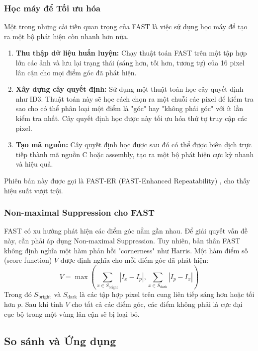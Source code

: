 \subsubsection{Học máy để Tối ưu hóa}
\label{subsubsec:fast_machine_learning}
Một trong những cải tiến quan trọng của FAST là việc sử dụng học máy để tạo ra một bộ phát hiện còn nhanh hơn nữa.
\begin{enumerate}
    \item \textbf{Thu thập dữ liệu huấn luyện:} Chạy thuật toán FAST trên một tập hợp lớn các ảnh và lưu lại trạng thái (sáng hơn, tối hơn, tương tự) của 16 pixel lân cận cho mọi điểm góc đã phát hiện.
    \item \textbf{Xây dựng cây quyết định:} Sử dụng một thuật toán học cây quyết định như ID3. Thuật toán này sẽ học cách chọn ra một chuỗi các pixel để kiểm tra sao cho có thể phân loại một điểm là "góc" hay "không phải góc" với ít lần kiểm tra nhất. Cây quyết định học được này tối ưu hóa thứ tự truy cập các pixel.
    \item \textbf{Tạo mã nguồn:} Cây quyết định học được sau đó có thể được biên dịch trực tiếp thành mã nguồn C hoặc assembly, tạo ra một bộ phát hiện cực kỳ nhanh và hiệu quả.
\end{enumerate}
Phiên bản này được gọi là FAST-ER (FAST-Enhanced Repeatability) \cite{Rosten2010}, cho thấy hiệu suất vượt trội.

\subsubsection{Non-maximal Suppression cho FAST}
\label{subsubsec:fast_nms}
FAST có xu hướng phát hiện các điểm góc nằm gần nhau. Để giải quyết vấn đề này, cần phải áp dụng Non-maximal Suppression. Tuy nhiên, bản thân FAST không định nghĩa một hàm phản hồi "cornerness" như Harris. Một hàm điểm số (score function) $V$ được định nghĩa cho mỗi điểm góc đã phát hiện:
\begin{equation}
    V = \max \left( \sum_{x \in S_{\text{bright}}} |I_x - I_p|, \sum_{x \in S_{\text{dark}}} |I_p - I_x| \right)
\end{equation}
Trong đó $S_{\text{bright}}$ và $S_{\text{dark}}$ là các tập hợp pixel trên cung liên tiếp sáng hơn hoặc tối hơn $p$. Sau khi tính $V$ cho tất cả các điểm góc, các điểm không phải là cực đại cục bộ trong một vùng lân cận sẽ bị loại bỏ.

\subsection{So sánh và Ứng dụng}
\label{subsec:keypoint_comparison_applications}

